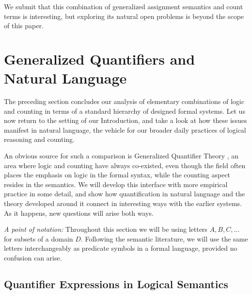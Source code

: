 \documentclass[12pt,oneside,reqno]{amsart}
\theoremstyle{definition}
\begin{document}
We submit that this combination of generalized assignment semantics and count terms is interesting, but exploring its natural open problems  is beyond the scope of this paper. 



\section{Generalized Quantifiers and Natural Language} \label{section:gq} The preceding section concludes our analysis of elementary combinations of logic and counting in terms of a standard hierarchy of designed formal systems. Let us now return to the setting of our Introduction, and take a look at how these issues manifest in natural language, the vehicle for our broader daily practices of logical reasoning and counting. 


An obvious source for such a comparison is Generalized Quantifier Theory \citep{BarwiseCooper,vanBenthem1985,PetersWesterstahl}, an area where logic and counting have always co-existed, even though the field often places the emphasis on logic in the formal syntax, while the counting aspect resides in the semantics. We will develop this interface with more empirical practice in some detail, and show how quantification in natural language and the theory developed around it connect in interesting ways with the earlier systems. As it happens, new questions will arise both ways.

\vspace{0.5ex}

{\it A point of notation:} Throughout this section we will be using letters $A,B,C,\dots$ for subsets of a domain $D$. Following the semantic literature, we will use the same letters interchangeably as predicate symbols in a formal language, provided no confusion can arise. 





\vspace{-1ex}


\subsection{Quantifier Expressions in Logical Semantics} \label{section:quantifiers}
\end{document}

